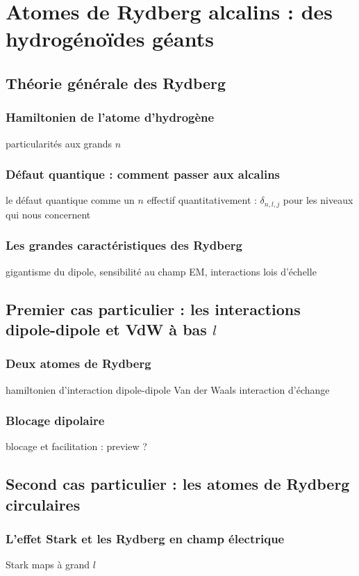 \chapter{Atomes de Rydberg alcalins : des hydrogénoïdes géants}
\label{chapter:Rydberg}


\section{Théorie générale des Rydberg}
	\subsection*{Hamiltonien de l'atome d'hydrogène}
		\noindent particularités aux grands $n$
	\subsection*{Défaut quantique : comment passer aux alcalins}
		\noindent le défaut quantique comme un $n$ effectif
		\noindent quantitativement : $\delta_{n,l,j}$ pour les niveaux qui nous concernent
	\subsection*{Les grandes caractéristiques des Rydberg}
		\noindent gigantisme du dipole, sensibilité au champ EM, interactions
		\noindent lois d'échelle


\section{Premier cas particulier : les interactions dipole-dipole et VdW à bas $l$}
	\subsection*{Deux atomes de Rydberg}
		\noindent hamiltonien d'interaction
		\noindent dipole-dipole
		\noindent Van der Waals
		\noindent interaction d'échange
	\subsection*{Blocage dipolaire}
		\noindent blocage et facilitation : preview ?


\section{Second cas particulier : les atomes de Rydberg circulaires}
	\subsection*{L'effet Stark et les Rydberg en champ électrique}
		\noindent Stark maps à grand $l$
